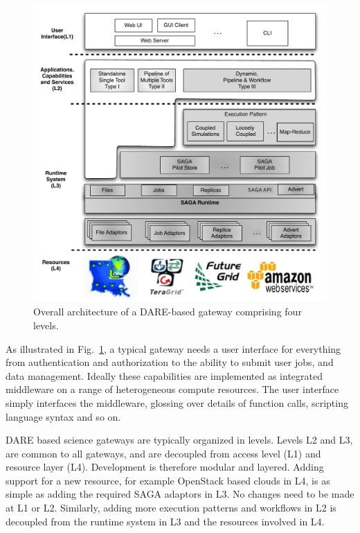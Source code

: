 \documentclass[]{svjour3}
\begin{document}
\begin{figure}
 \centering
 \includegraphics[scale=0.55]{figures/DARE-gateway-arch.pdf}
 \caption{\small {} Overall architecture of a
 DARE-based gateway comprising four levels. 
 }
 \label{fig:dare-arch} 
\end{figure}


As illustrated in Fig.~\ref{fig:dare-arch}, a typical gateway needs a
user interface for everything from authentication and authorization
to the ability to submit user jobs, and data management. 
Ideally these capabilities are implemented as integrated middleware on
a range of heterogeneous compute resources. The user interface simply
interfaces the middleware, glossing over details of function calls,
scripting language syntax and so on.

DARE based science gateways are typically organized in levels.
Levels L2 and L3, are common to all gateways, and are decoupled from
access level (L1) and resource layer (L4). Development is therefore
modular and layered. Adding support for a new resource, for example
OpenStack based clouds in L4, is as simple as adding the required SAGA
adaptors in L3. No changes need to be made at L1 or L2. Similarly,
adding more execution patterns and workflows in L2 is decoupled
from the runtime system in L3 and the resources involved in L4.
\end{document}
